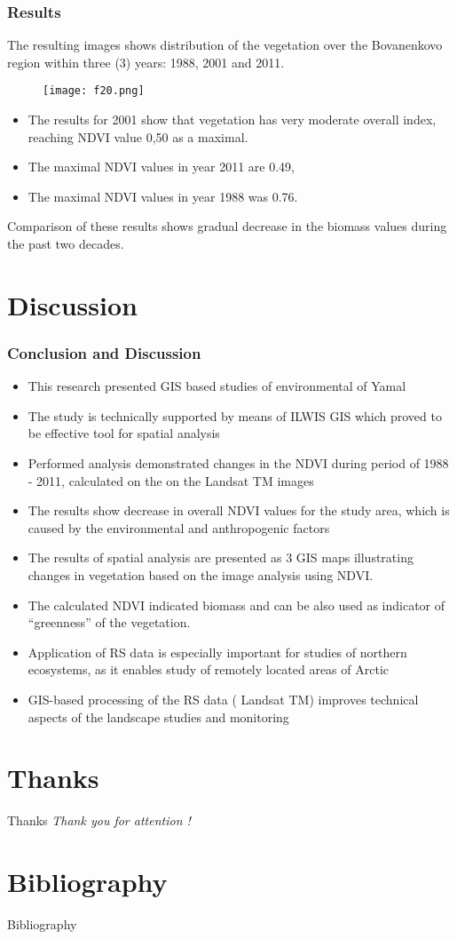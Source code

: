 \documentclass[pdflatex,compress,8pt,
	xcolor={dvipsnames,dvipsnames,svgnames,x11names,table},
	hyperref={colorlinks = true,breaklinks = true, urlcolor = NavyBlue, breaklinks = true}]{beamer}
\begin{document}
\begin{frame}\frametitle{Results}
The resulting images shows distribution of the vegetation over the Bovanenkovo region within three (3) years: 1988, 2001 and 2011.
\begin{figure}[H]
	\centering
		\texttt{[image: f20.png]}
\end{figure}
 \begin{itemize}
	\item The results for 2001 show that vegetation has very moderate overall index, reaching NDVI value 0,50 as a maximal.
	\item The maximal NDVI values in year 2011 are 0.49,
	\item The maximal NDVI values in year 1988 was 0.76.
\end{itemize}
Comparison of these results shows gradual decrease in the biomass values during the past two decades.
\end{frame}

\section{Discussion} 
\begin{frame}\frametitle{Conclusion and Discussion}
 \begin{itemize}
        	\item This research presented GIS based studies of environmental of Yamal
	\item The study is technically supported by means of ILWIS GIS which proved to be effective tool for spatial analysis
	\item Performed analysis demonstrated changes in the NDVI during period of 1988 - 2011, calculated on the on the Landsat TM images
	\item The results show decrease in overall NDVI values for the study area, which is caused by the environmental and anthropogenic factors
	\item The results of spatial analysis are presented as 3 GIS maps illustrating changes in vegetation based on the image analysis using NDVI.
	\item The calculated NDVI indicated biomass and can be also used as indicator of “greenness” of the vegetation.
	\item Application of RS data is especially important for studies of northern ecosystems, as it enables study of remotely located areas of Arctic
	\item GIS-based processing of the RS data ( Landsat TM) improves technical aspects of the landscape studies and monitoring
\end{itemize}
\end{frame}

\section{Thanks}
\begin{frame}{Thanks}
  	\centering \Huge 
  	\emph{Thank you for attention !}
\end{frame}

\section{Bibliography}
\Huge{Bibliography}
\nocite{*}
\printbibliography

	
\end{document}
